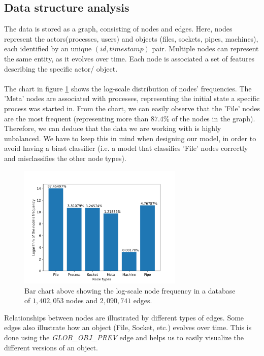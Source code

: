 	\subsection{Data structure analysis}
	The data is stored as a graph, consisting of nodes and edges. Here, nodes represent the actors(processes, users) and objects (files, sockets, pipes, machines), each identified by an unique $(id, timestamp)$ pair. Multiple nodes can represent the same entity, as it evolves over time. Each node is associated a set of features describing the specific actor/ object. 
	\\ \\
	The chart in figure \ref{Figure 2.1.1} shows the log-scale distribution of nodes' frequencies. The 'Meta' nodes are associated with processes, representing the initial state a specific process was started in. From the chart, we can easily observe that the 'File' nodes are the most frequent (representing more than $87.4\%$ of the nodes in the graph). Therefore, we can deduce that the data we are working with is highly unbalanced. We have to keep this in mind when designing our model, in order to avoid having a biast classifier (i.e. a model that classifies 'File' nodes correctly and misclassifies the other node types). 
	\begin{figure}[H]
		\centering
		\label{Figure 2.1.1}
		\includegraphics[width=0.7\textwidth]{graphics/node-freq-graph}
		\caption[\textbf{Log-scale node frequency}]{
			Bar chart above showing the log-scale node frequency in a database of $1,402,053$ nodes and $2,090,741$ edges. 
		}
	\end{figure}
	Relationships between nodes are illustrated by different types of edges. Some edges also illustrate how an object (File, Socket, etc.) evolves over time. This is done using the \textit{GLOB\_OBJ\_PREV} edge and helps us to easily visualize the different versions of an object.
